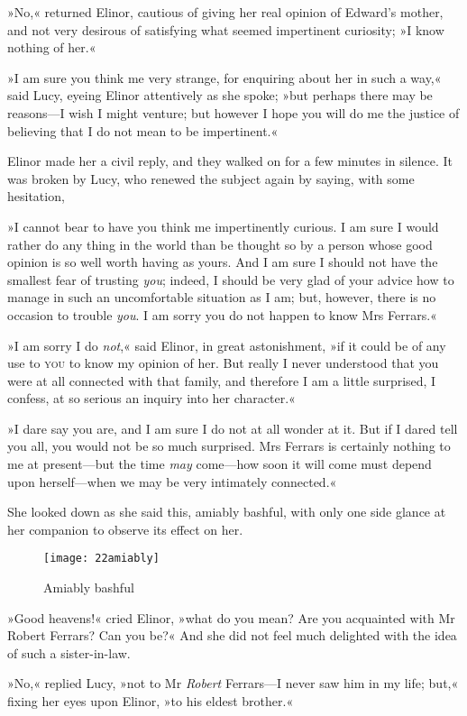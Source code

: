 »No,« returned Elinor, cautious of giving her real opinion of Edward’s mother, and not very desirous of satisfying what seemed impertinent curiosity; »I know nothing of her.«

»I am sure you think me very strange, for enquiring about her in such a way,« said Lucy, eyeing Elinor attentively as she spoke; »but perhaps there may be reasons—I wish I might venture; but however I hope you will do me the justice of believing that I do not mean to be impertinent.«

Elinor made her a civil reply, and they walked on for a few minutes in silence. It was broken by Lucy, who renewed the subject again by saying, with some hesitation,

»I cannot bear to have you think me impertinently curious. I am sure I would rather do any thing in the world than be thought so by a person whose good opinion is so well worth having as yours. And I am sure I should not have the smallest fear of trusting \textit{you}; indeed, I should be very glad of your advice how to manage in such an uncomfortable situation as I am; but, however, there is no occasion to trouble \textit{you}. I am sorry you do not happen to know Mrs Ferrars.«

»I am sorry I do \textit{not},« said Elinor, in great astonishment, »if it could be of any use to \textsc{you} to know my opinion of her. But really I never understood that you were at all connected with that family, and therefore I am a little surprised, I confess, at so serious an inquiry into her character.«

»I dare say you are, and I am sure I do not at all wonder at it. But if I dared tell you all, you would not be so much surprised. Mrs Ferrars is certainly nothing to me at present—but the time \textit{may} come—how soon it will come must depend upon herself—when we may be very intimately connected.«

She looked down as she said this, amiably bashful, with only one side glance at her companion to observe its effect on her.

\begin{figure}[tbph]
\centering
\texttt{[image: 22amiably]}
\caption{Amiably bashful}
\end{figure}

»Good heavens!« cried Elinor, »what do you mean? Are you acquainted with Mr Robert Ferrars? Can you be?« And she did not feel much delighted with the idea of such a sister-in-law.

»No,« replied Lucy, »not to Mr \textit{Robert} Ferrars—I never saw him in my life; but,« fixing her eyes upon Elinor, »to his eldest brother.«

